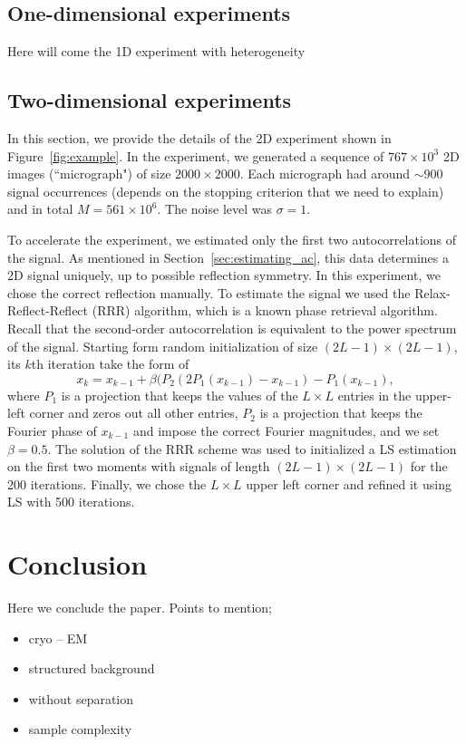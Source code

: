\documentclass[english,11pt]{article}
\numberwithin{equation}{section}
\theoremstyle{plain}
\theoremstyle{definition}
\theoremstyle{remark}
\theoremstyle{plain}
\theoremstyle{remark}
\theoremstyle{plain}
\theoremstyle{plain}
\begin{document}
\subsection{One-dimensional experiments}

Here will come the 1D experiment with heterogeneity

\subsection{Two-dimensional experiments}

In this section, we provide the details of the 2D experiment shown in Figure~\ref{fig:example}. In the experiment, we generated a sequence of $767\times 10^3$ 2D images (``micrograph") of size $2000\times 2000$. Each micrograph had around $\sim 900$ signal occurrences (depends on the stopping criterion that we need to explain) and in total $M = 561\times 10^6$. The noise level was $\sigma=1$.  

To accelerate the experiment, we estimated only the first two autocorrelations of the signal. As mentioned in Section~\ref{sec:estimating_ac}, this data determines a 2D signal uniquely, up to possible reflection symmetry. 
In this experiment, we chose the correct reflection manually. To estimate the signal we used the Relax-Reflect-Reflect (RRR) algorithm, which is a known phase retrieval algorithm. Recall that the second-order autocorrelation is equivalent to the power spectrum of the signal.
Starting form random initialization of size $(2L-1)\times(2L-1)$, its $k$th  iteration take the form of 
 \begin{equation*}
 x_k = x_{k-1} + \beta(P_2(2P_1(x_{k-1}) -x_{k-1}) - P_1(x_{k-1}), 
  \end{equation*}
 where $P_1$ is a projection that keeps the values of the  $L\times L$ entries in the upper-left corner and zeros out all other entries, $P_2$ is a projection that keeps the Fourier phase of $x_{k-1}$ and impose the correct Fourier magnitudes, and we set $\beta = 0.5$. The solution of the RRR scheme was used to initialized a LS estimation on the first two moments with signals of length $(2L-1)\times(2L-1)$ for the 200 iterations. Finally, we chose the $L\times L$ upper left corner and refined it using LS with 500 iterations. 
 
\section{Conclusion} 
Here we conclude the paper. Points to mention;
\begin{itemize}
\item cryo -- EM
\item  structured background 
\item   without separation   	
\item  sample complexity
\end{itemize}
	
\end{document}
